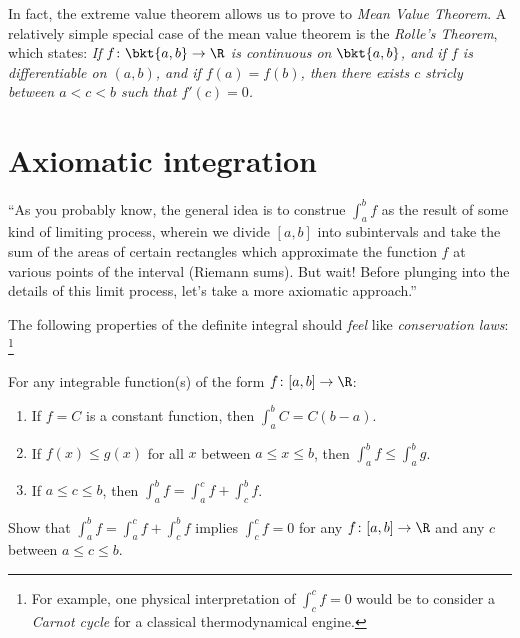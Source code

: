 \documentclass{ccg-topic}
\begin{document}
\begin{ex}
    \label{ex:rolle_s_theorem}
    In fact, the extreme value theorem allows us to prove to \emph{Mean Value Theorem}. A relatively simple special case of the mean value theorem is the \emph{Rolle's Theorem}, which states: 
    \emph{If $f \colon \bkt{a,b} \to \R$ is continuous on $\bkt{a,b}$, and if $f$ is differentiable on $(a,b)$, and if $f(a) = f(b)$, then there exists $c$ stricly between $a < c < b$ such that $f'(c) = 0$.}
\end{ex}

\section{Axiomatic integration}
``As you probably know, the general idea is to construe $\int_a^b f$ as the result of some kind of limiting process, wherein we divide $[a,b]$ into subintervals and take the sum of the areas of certain rectangles which approximate the function $f$ at various points of the interval (\textrm{Riemann sums}). But wait! Before plunging into the details of this limit process, let's take a more \textrm{axiomatic} approach.'' 

The following properties of the definite integral should \emph{feel} like \emph{conservation laws}:%
    \footnote{%
    For example, one physical interpretation of $\int_c^c f = 0$ would be to consider a \emph{Carnot cycle} for a classical thermodynamical engine.
    }

    \begin{defn}
        \label{defn:axioms_for_integrable_functions}
        For any integrable function(s) of the form $f \colon [a,b] \to \R$:
        \begin{enumerate}
            \item If $f = C$ is a constant function, then $\int_a^b C = C(b-a)$.
            \item If $f(x) \le g(x)$ for all $x$ between $a \le x \le b$, then $\int_a^b f \le \int_a^b g$.
            \item If $a \le c \le b$, then $\int_a^b f = \int_a^c f + \int_c^b f$.
        \end{enumerate}
    \end{defn}

\begin{todo}
    \label{todo:closed_loops_in_the_real_line}
    Show that $\int_a^b f = \int_a^c f + \int_c^b f$ implies $\int_c^c f = 0$ for any $f \colon [a,b] \to \R$ and any $c$ between $a \le c \le b$. 
\end{todo}
\end{document}
